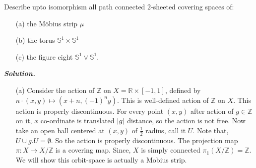 \documentclass[11pt]{article}
\newcommand{\bb}[1]{\mathbb{#1}}
\newcommand{\Z}{\bb{Z}}
\newcommand{\R}{\mathbb{R}}
\newcommand{\s}{\bb{S}}
\newcommand{\sol}{ \textbf{\textit{Solution.}} }
\begin{document}
 \begin{prob}{}{}
    Describe upto isomorphism all path connected 2-sheeted covering spaces of:
\begin{enumerate}
    \item[(a)] the M\"{o}bius strip $\mu$
    \item[(b)] the torus $\s^1 \times \s^1$
    \item[(c)] the figure eight $\s^1 \vee \s^1$.   
\end{enumerate}
 \end{prob}
\sol
 \begin{itemize}
    \item[(a)]  Consider the action of $\Z$ on $X=\R \times [-1,1]$, defined by $n \cdot (x,y) \mapsto (x+n,(-1)^ny)$. This is well-defined action of $\Z$ on $X$. This action is properly discontinuous. For every point $(x,y)$ after action of $g\in \Z$ on it, $x$ co-ordinate is translated $\abs{g}$ distance, so the action is not free. Now take an open ball centered at $(x,y)$ of $\frac{1}{2}$ radius, call it $U$. Note that, $U \cup g.U =\emptyset$. So the action is properly discontinuous. The projection map $\pi : X \to X/\Z$ is a covering map. Since, $X$ is simply connected $\pi_1(X/\Z) =\Z$.  We will show this orbit-space is actually a Mobius strip. 
    
     \begin{figure}[htbp]
          \centering 

\begin{tikzpicture}[x=0.75pt,y=0.75pt,yscale=-1,xscale=1]


\end{tikzpicture}
\end{figure}
\end{itemize}
\end{document}

